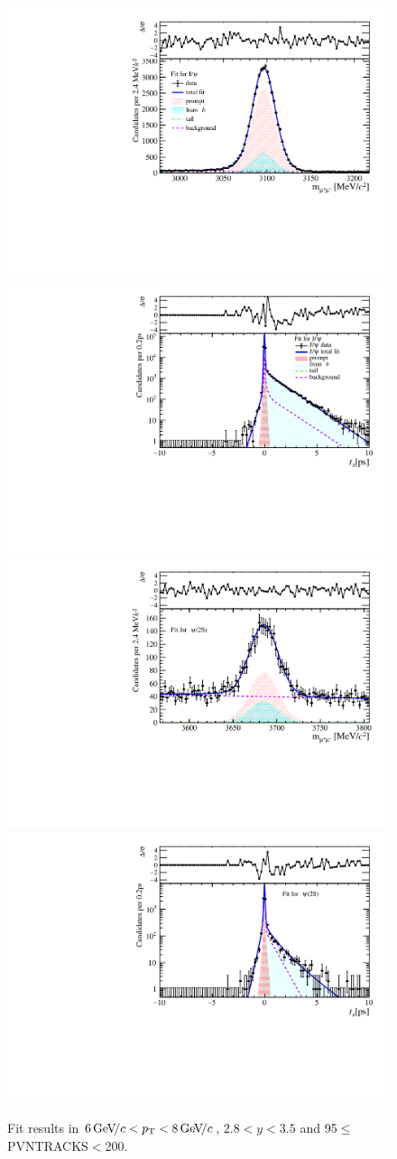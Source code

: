 \begin{figure}[H]
\begin{center}
\includegraphics[width=0.47\linewidth]{pdf/Jpsi/drawmass/n5y2pt4.pdf}
\includegraphics[width=0.47\linewidth]{pdf/Jpsi/2DFit/n5y2pt4.pdf}
\vspace*{-0.5cm}
\includegraphics[width=0.47\linewidth]{pdf/Psi2S/drawmass/n5y2pt4.pdf}
\includegraphics[width=0.47\linewidth]{pdf/Psi2S/2DFit/n5y2pt4.pdf}
\vspace*{-0.5cm}
\end{center}
\caption{Fit results in $6\text{\,Ge\kern -0.1em V\!/}c<p_{\mathrm{T}}<8\text{\,Ge\kern -0.1em V\!/}c$, $2.8<y<3.5$ and 95$\leq$PVNTRACKS$<$200.}
\label{Fitn5y2pt4}
\end{figure}
